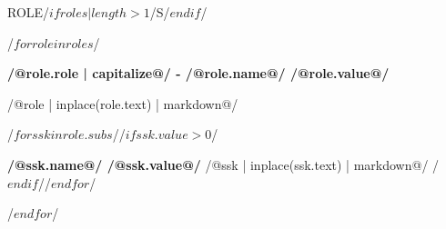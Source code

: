\centerline{\large ROLE/$if roles|length >1$/S/$endif$/ }
\small
/$ for role in roles $/
\begin{minipage}{\columnwidth}
\centerline{\textbf{/@role.role | capitalize@/ - /@role.name@/ /@role.value@/}}

/@role | inplace(role.text) | markdown@/

/$for ssk in role.subs $//$if ssk.value > 0 $/
\vspace*{6pt}\null

\noindent\textbf{  /@ssk.name@/ /@ssk.value@/ }
/@ssk | inplace(ssk.text) | markdown@/
/$endif$//$endfor$/
\hrulefill
\end{minipage}

\vfill\null
/$ endfor $/
\normalsize